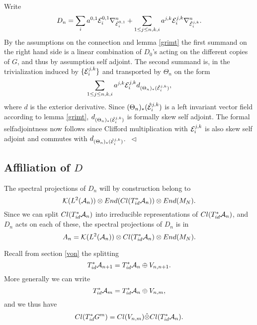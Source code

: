 \documentclass[12pt]{article}
\newcommand{\eproof}{{~\hfill$ \triangleleft$}}
\def\ca{{\cal A}}
\def\ce{{\cal E}}
\def\ch{{\cal H}}
\def\ck{{\cal K}}
\begin{document}
{Write
$$D_n=\sum_{i}a^{0,1}\ce_i^{0,1}\nabla^n_{\hat{\ce}_i^{0,1}}+\sum_{1\leq j\leq n,k,i}a^{j,k}\ce_i^{j,k}\nabla^n_{\hat{\ce}_i^{j,k}}.$$ 
By the assumptions on the connection and lemma \ref{grimt} the first summand on the right hand side is a linear combination of $D_0$'s acting on the different copies of $G$, and thus by assumption self adjoint. The second summand is, in the trivialization induced by $\{\ce_i^{j,k} \}$ and transported by $\Theta_n$ on the form
$$ \sum_{1\leq j\leq n,k,i}a^{j,k}\ce_i^{j,k} d_{(\Theta_n)_*(\hat{\ce}_i^{j,k})},$$ 
where $d$ is the exterior derivative. Since  $(\Theta_n)_*(\hat{\ce}_i^{j,k})$ is a left invariant vector field according to lemma \ref{grimt}, $d_{(\Theta_n)_*(\hat{\ce}_i^{j,k})}$ is formally skew self adjoint. The formal selfadjointness now follows since Clifford multiplication with $ \ce_i^{j,k}$ is also skew self adjoint and commutes with $d_{(\Theta_n)_*(\hat{\ce}_i^{j,k})}$. \eproof 

\subsection{Affiliation of $D$}
The spectral projections of $D_n$ will by construction belong to 
$$\ck(L^2(\ca_{n}))\otimes End (Cl(T^*_{id}\ca_{n})) \otimes End(M_N).$$
Since we can split $Cl(T^*_{id}\ca_{n})$ into irreducible representations of  $Cl(T^*_{id}\ca_{n})$, and $D_n$ acts on each of these,  the spectral projections of $D_n$ is in 
$$A_n=\ck(L^2(\ca_{n}))\otimes Cl(T^*_{id}\ca_{n}) \otimes End(M_N).$$

Recall from section \ref{von} the splitting
$$T^*_{id}\ca_{n+1}=T^*_{id}\ca_{n}\oplus V_{n,n+1}.$$
More generally we can write
$$T^*_{id}\ca_{m}=T^*_{id}\ca_{n}\oplus V_{n,m},$$
and we thus have
\begin{equation} \label{tensor}
Cl(T^*_{id}G^m)=Cl(V_{n,m})\hat{\otimes} Cl(T^*_{id}\ca_{n}).
\end{equation}

}
\end{document}
